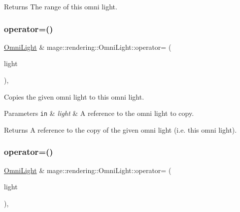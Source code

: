 \begin{DoxyReturn}{Returns}
The range of this omni light. 
\end{DoxyReturn}
\hypertarget{classmage_1_1rendering_1_1_omni_light_aac914061f6798131e7f59275b4716b48}{}\label{classmage_1_1rendering_1_1_omni_light_aac914061f6798131e7f59275b4716b48} 
\subsubsection{\texorpdfstring{operator=()}{operator=()}\hspace{0.1cm}{\footnotesize\ttfamily [1/2]}}
{\footnotesize\ttfamily \hyperlink{classmage_1_1rendering_1_1_omni_light}{Omni\+Light} \& mage\+::rendering\+::\+Omni\+Light\+::operator= (\begin{DoxyParamCaption}\item[{const \hyperlink{classmage_1_1rendering_1_1_omni_light}{Omni\+Light} \&}]{light }\end{DoxyParamCaption})\hspace{0.3cm}{\ttfamily [default]}, {\ttfamily [noexcept]}}

Copies the given omni light to this omni light.


\begin{DoxyParams}[1]{Parameters}
\mbox{\tt in}  & {\em light} & A reference to the omni light to copy. \\
\hline
\end{DoxyParams}
\begin{DoxyReturn}{Returns}
A reference to the copy of the given omni light (i.\+e. this omni light). 
\end{DoxyReturn}
\hypertarget{classmage_1_1rendering_1_1_omni_light_a8126d5d0d3a45d0063c3fd2f28e3826e}{}\label{classmage_1_1rendering_1_1_omni_light_a8126d5d0d3a45d0063c3fd2f28e3826e} 
\subsubsection{\texorpdfstring{operator=()}{operator=()}\hspace{0.1cm}{\footnotesize\ttfamily [2/2]}}
{\footnotesize\ttfamily \hyperlink{classmage_1_1rendering_1_1_omni_light}{Omni\+Light} \& mage\+::rendering\+::\+Omni\+Light\+::operator= (\begin{DoxyParamCaption}\item[{\hyperlink{classmage_1_1rendering_1_1_omni_light}{Omni\+Light} \&\&}]{light }\end{DoxyParamCaption})\hspace{0.3cm}{\ttfamily [default]}, {\ttfamily [noexcept]}}

